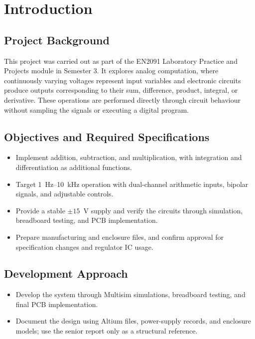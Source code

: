 \documentclass[11pt,a4paper]{article}
\begin{document}
\tableofcontents
\clearpage
{}

\section{Introduction}
\subsection{Project Background}
This project was carried out as part of the EN2091 Laboratory Practice and Projects module in Semester 3. It explores analog computation, where continuously varying voltages represent input variables and electronic circuits produce outputs corresponding to their sum, difference, product, integral, or derivative. These operations are performed directly through circuit behaviour without sampling the signals or executing a digital program.

\subsection{Objectives and Required Specifications}
\begin{itemize}
    \item Implement addition, subtraction, and multiplication, with integration and differentiation as additional functions.
    \item Target 1~Hz--10~kHz operation with dual-channel arithmetic inputs, bipolar signals, and adjustable controls.
    \item Provide a stable $\pm15$~V supply and verify the circuits through simulation, breadboard testing, and PCB implementation.
    \item Prepare manufacturing and enclosure files, and confirm approval for specification changes and regulator IC usage.
\end{itemize}

\subsection{Development Approach}
\begin{itemize}
    \item Develop the system through Multisim simulations, breadboard testing, and final PCB implementation.
    \item Document the design using Altium files, power-supply records, and enclosure models; use the senior report only as a structural reference.
\end{itemize}
\end{document}
